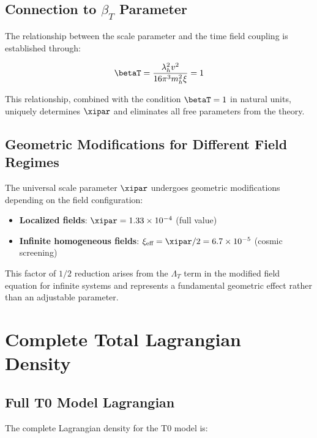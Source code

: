 	\subsection{Connection to $\beta_T$ Parameter}
	\label{subsec:beta_t_connection}
	
	The relationship between the scale parameter and the time field coupling is established through:
	
	\begin{equation}
		\betaT = \frac{\lambda_h^2 v^2}{16\pi^3 m_h^2 \xi} = 1
		\label{eq:beta_t_relationship}
	\end{equation}
	
	This relationship, combined with the condition $\betaT = 1$ in natural units, uniquely determines $\xipar$ and eliminates all free parameters from the theory.
	
	\subsection{Geometric Modifications for Different Field Regimes}
	\label{subsec:geometric_modifications}
	
	The universal scale parameter $\xipar$ undergoes geometric modifications depending on the field configuration:
	
	\begin{itemize}
		\item \textbf{Localized fields}: $\xipar = 1.33 \times 10^{-4}$ (full value)
		\item \textbf{Infinite homogeneous fields}: $\xi_{\text{eff}} = \xipar/2 = 6.7 \times 10^{-5}$ (cosmic screening)
	\end{itemize}
	
	This factor of $1/2$ reduction arises from the $\Lambda_T$ term in the modified field equation for infinite systems and represents a fundamental geometric effect rather than an adjustable parameter.
	
	\section{Complete Total Lagrangian Density}
	\label{sec:total_lagrangian}
	
	\subsection{Full T0 Model Lagrangian}
	\label{subsec:full_lagrangian}
	
	The complete Lagrangian density for the T0 model is:
	
